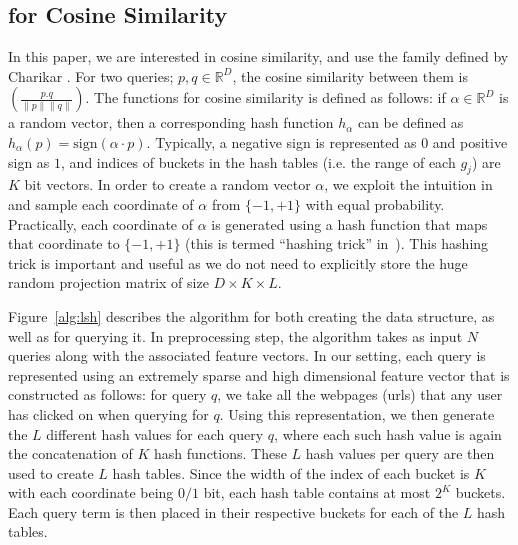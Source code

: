 \subsection{\lsh for Cosine Similarity}
\label{subsec:vlsh:cosine}
In this paper, we are interested in cosine similarity, and use the \lsh family defined by Charikar . 
For two queries; $p,q \in \mathbb{R}^D$, the cosine similarity between them is $\left( \frac{p.q}{ \| p \| \| q \| }\right)$. 
The \lsh functions for cosine similarity is defined as follows: if $\alpha \in \mathbb{R}^D$ is a random vector, 
then a corresponding hash function $h_{\alpha}$ can be defined as $h_{\alpha}(p) = \mathrm{sign}(\alpha \cdot p)$.
Typically, a negative sign is represented as $0$ and positive sign as $1$, and indices of buckets in the hash tables (i.e. the
range of each $g_j$) are $K$ bit vectors. 
In order to create a random vector $\alpha$, we exploit the intuition in
\cite{Achlioptas03,LiH06} and sample each coordinate of $\alpha$ from $\{-1, +1\}$ with equal probability.
Practically, each coordinate of $\alpha$ is generated using a hash function that maps that coordinate
to $\{-1, +1\}$ (this is termed ``hashing trick'' in~\cite{weinberger09hashing}). 
This hashing trick is important and useful as we do not need to explicitly store the 
huge random projection matrix of size $D \times K \times L$.  

%
Figure~\ref{alg:lsh} describes the algorithm for both creating the data structure, as well as for
querying it. In preprocessing step, the algorithm takes as input $N$ queries along with the associated feature vectors. 
In our setting, each query is represented using an extremely sparse and high dimensional feature vector
that is constructed as follows: for query $q$, we take all the webpages (urls) that any user has clicked on 
when querying for $q$. Using this representation, we then generate the 
$L$ different hash values for each query $q$, where each such hash value is again 
the concatenation of $K$ hash functions. These $L$ hash values per query are then used to create $L$ hash tables.
Since the width of the index of each bucket is $K$ with each coordinate being $0/1$ bit, each hash table contains at most $2^K$ buckets. 
Each query term is then placed in their respective buckets for each of the $L$ hash tables.

